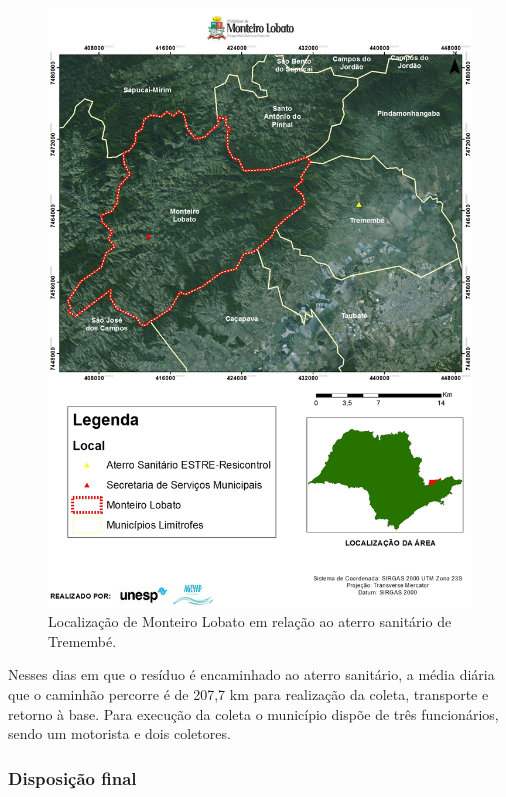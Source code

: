 	\begin{figure}
		\centering
		\includegraphics[width=1\linewidth]{produtos/prodtres/image017}
		\caption{Localização de Monteiro Lobato em relação ao aterro sanitário de Tremembé.}
		\label{fig:image017}
	\end{figure}
	
	
	Nesses dias em que o resíduo é encaminhado ao aterro sanitário, a média diária que o caminhão percorre é de 207,7 km para realização da coleta, transporte e retorno à base. Para execução da coleta o município dispõe de três funcionários, sendo um motorista e dois coletores.
	
	\subsubsection{Disposição final}
	
